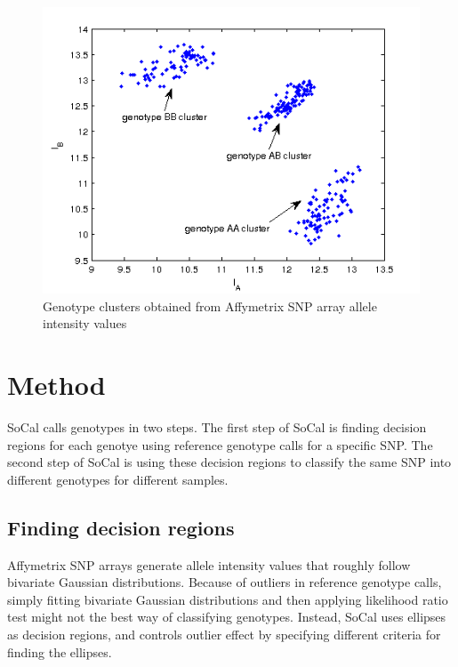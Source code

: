 \documentclass{scrartcl}
\begin{document}
\begin{figure}[H]
    \centering
    \includegraphics[scale=0.75]
    {introduction_figures/introductoin_cluster.png}
    \caption{Genotype clusters obtained from Affymetrix SNP array
             allele intensity values}
    \label{fig:intro_genclus}
\end{figure}


\section{Method}

\par
SoCal calls genotypes in two steps.
The first step of SoCal is finding decision regions for each genotye
using reference genotype calls for a specific SNP.
The second step of SoCal is using these decision regions to
classify the same SNP into different genotypes for different samples.

\subsection{Finding decision regions}

\par
Affymetrix SNP arrays generate allele intensity values that roughly follow
bivariate Gaussian distributions.
Because of outliers in reference genotype calls, simply fitting bivariate
Gaussian distributions and then applying likelihood ratio test might not the
best way of classifying genotypes.
Instead, SoCal uses ellipses as decision regions, and controls outlier effect
by specifying different criteria for finding the ellipses.
\end{document}
